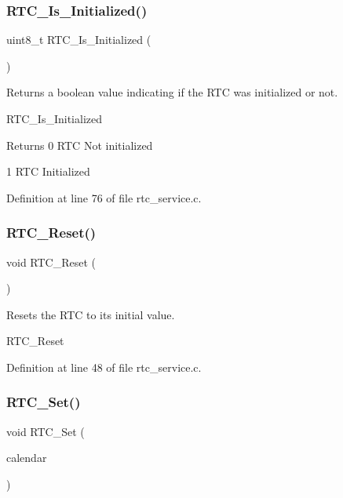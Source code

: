 \subsubsection{\texorpdfstring{R\+T\+C\+\_\+\+Is\+\_\+\+Initialized()}{RTC\_Is\_Initialized()}}
{\footnotesize\ttfamily uint8\+\_\+t R\+T\+C\+\_\+\+Is\+\_\+\+Initialized (\begin{DoxyParamCaption}{ }\end{DoxyParamCaption})}



Returns a boolean value indicating if the R\+TC was initialized or not. 

R\+T\+C\+\_\+\+Is\+\_\+\+Initialized

\begin{DoxyReturn}{Returns}
0 R\+TC Not initialized 

1 R\+TC Initialized 
\end{DoxyReturn}


Definition at line 76 of file rtc\+\_\+service.\+c.

\mbox{\label{group___r_t_c___service_ga06c8dc761f0e0779c30a4c5e17d7c1f1}} 
\subsubsection{\texorpdfstring{R\+T\+C\+\_\+\+Reset()}{RTC\_Reset()}}
{\footnotesize\ttfamily void R\+T\+C\+\_\+\+Reset (\begin{DoxyParamCaption}{ }\end{DoxyParamCaption})}



Resets the R\+TC to its initial value. 

R\+T\+C\+\_\+\+Reset 

Definition at line 48 of file rtc\+\_\+service.\+c.

\mbox{\label{group___r_t_c___service_ga2d4f183e21b0ef653b41301d3ff215d0}} 
\subsubsection{\texorpdfstring{R\+T\+C\+\_\+\+Set()}{RTC\_Set()}}
{\footnotesize\ttfamily void R\+T\+C\+\_\+\+Set (\begin{DoxyParamCaption}\item[{mss\+\_\+rtc\+\_\+calendar\+\_\+t $\ast$}]{calendar }\end{DoxyParamCaption})}



